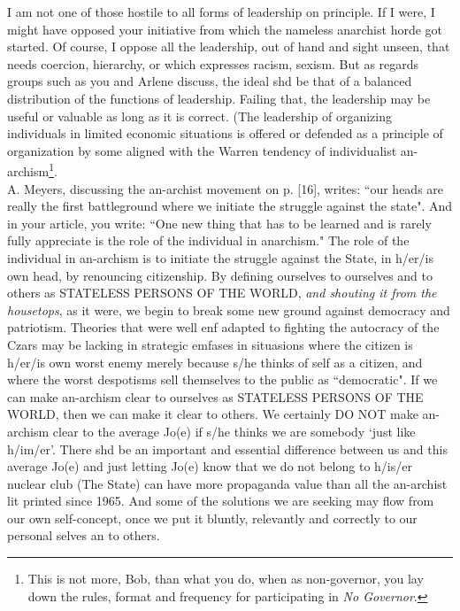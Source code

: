 I am not one of those hostile to all forms of leadership on principle. If I were, I might have opposed your initiative from which the nameless anarchist horde got started. Of course, I oppose all the leadership, out of hand and sight unseen, that needs coercion, hierarchy, or which expresses racism, sexism. But as regards groups such as you and Arlene discuss, the ideal shd be that of a balanced distribution of the functions of leadership. Failing that, the leadership may be useful or valuable as long as it is correct. (The leadership of organizing individuals in limited economic situations is offered or defended as a principle of organization by some aligned with the Warren tendency of individualist an-archism\footnote{This is not more, Bob, than what you do, when as non-governor, you lay down the rules, format and frequency for participating in \emph{No Governor}.}.\\
A. Meyers, discussing the an-archist movement on p. [16], writes: ``our heads are really the first battleground where we initiate the struggle against the state". And in your article, you write: ``One new thing that has to be learned and is rarely fully appreciate is the role of the individual in anarchism." The role of the individual in an-archism is to initiate the struggle against the State, in h/er/is own head, by renouncing citizenship. By defining ourselves to ourselves and to others as STATELESS PERSONS OF THE WORLD, \emph{and shouting it from the housetops}, as it were, we begin to break some new ground against democracy and patriotism. Theories that were well enf adapted to fighting the autocracy of the Czars may be lacking in strategic emfases in situasions where the citizen is h/er/is own worst enemy merely because s/he thinks of self as a citizen, and where the worst despotisms sell themselves to the public as ``democratic". If we can make an-archism clear to ourselves as STATELESS PERSONS OF THE WORLD, then we can make it clear to others. We certainly DO NOT make an-archism clear to the average Jo(e) if s/he thinks we are somebody `just like h/im/er'. There shd be an important and essential difference between us and this average Jo(e) and just letting Jo(e) know that we do not belong to h/is/er nuclear club (The State) can have more propaganda value than all the an-archist lit printed since 1965. And some of the solutions we are seeking may flow from our own self-concept, once we put it bluntly, relevantly and correctly to our personal selves an to others.\\
